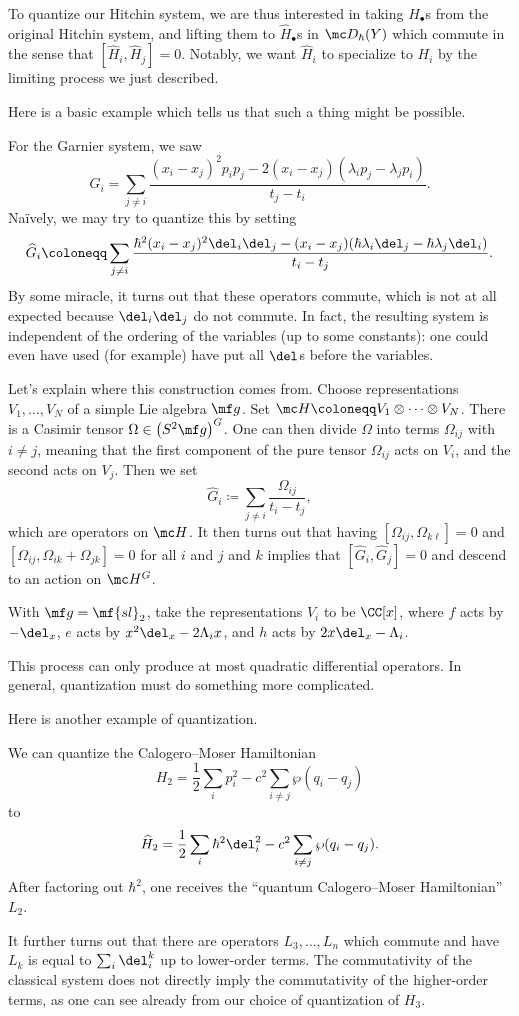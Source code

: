 \documentclass[../notes.tex]{subfiles}
\begin{document}
To quantize our Hitchin system, we are thus interested in taking $H_\bullet$s from the original Hitchin system, and lifting them to $\widehat H_\bullet$s in $\mc D_{\hbar}(Y)$ which commute in the sense that $[\widehat H_i,\widehat H_j]=0$. Notably, we want $\widehat H_i$ to specialize to $H_i$ by the limiting process we just described.

Here is a basic example which tells us that such a thing might be possible.
\begin{example}
	For the Garnier system, we saw
	\[G_i=\sum_{j\ne i}\frac{(x_i-x_j)^2p_ip_j-2(x_i-x_j)(\lambda_ip_j-\lambda_jp_i)}{t_j-t_i}.\]
	Na\"ively, we may try to quantize this by setting
	\[\widehat G_i\coloneqq\sum_{j\ne i}\frac{\hbar^2(x_i-x_j)^2\del_i\del_j-(x_i-x_j)(\hbar\lambda_i\del_j-\hbar\lambda_j\del_i)}{t_i-t_j}.\]
	By some miracle, it turns out that these operators commute, which is not at all expected because $\del_i\del_j$ do not commute. In fact, the resulting system is independent of the ordering of the variables (up to some constants): one could even have used (for example) have put all $\del$s before the variables.
\end{example}
Let's explain where this construction comes from. Choose representations $V_1,\ldots,V_N$ of a simple Lie algebra $\mf g$. Set $\mc H\coloneqq V_1\otimes\cdots\otimes V_N$. There is a Casimir tensor $\Omega\in\left(S^2\mf g\right)^G$. One can then divide $\Omega$ into terms $\Omega_{ij}$ with $i\ne j$, meaning that the first component of the pure tensor $\Omega_{ij}$ acts on $V_i$, and the second acts on $V_j$. Then we set
\[\widehat G_i\coloneqq\sum_{j\ne i}\frac{\Omega_{ij}}{t_i-t_j},\]
which are operators on $\mc H$. It then turns out that having $[\Omega_{ij},\Omega_{k\ell}]=0$ and $[\Omega_{ij},\Omega_{ik}+\Omega_{jk}]=0$ for all $i$ and $j$ and $k$ implies that $[\widehat G_i,\widehat G_j]=0$ and descend to an action on $\mc H^G$.
\begin{example}
	With $\mf g=\mf{sl}_2$, take the representations $V_i$ to be $\CC[x]$, where $f$ acts by $-\del_x$, $e$ acts by $x^2\del_x-2\Lambda_ix$, and $h$ acts by $2x\del_x-\Lambda_i$.
\end{example}
\begin{remark}
	This process can only produce at most quadratic differential operators. In general, quantization must do something more complicated.
\end{remark}
Here is another example of quantization.
\begin{example}
	We can quantize the Calogero--Moser Hamiltonian
	\[H_2=\frac12\sum_ip_i^2-c^2\sum_{i\ne j}\wp(q_i-q_j)\]
	to
	\[\widehat H_2=\frac12\sum_i\hbar^2\del_i^2-c^2\sum_{i\ne j}\wp(q_i-q_j).\]
	After factoring out $\hbar^2$, one receives the ``quantum Calogero--Moser Hamiltonian'' $L_2$.
\end{example}
\begin{remark}
	It further turns out that there are operators $L_3,\ldots,L_n$ which commute and have $L_k$ is equal to $\sum_i\del_i^k$ up to lower-order terms. The commutativity of the classical system does not directly imply the commutativity of the higher-order terms, as one can see already from our choice of quantization of $H_3$.
\end{remark}
\end{document}
